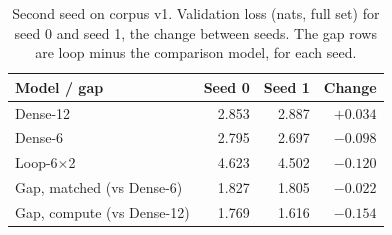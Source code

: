 \begin{table}[t]
\centering
\caption{Second seed on corpus v1. Validation loss (nats, full set) for seed 0 and seed 1, the change between seeds. The gap rows are loop minus the comparison model, for each seed.}
\label{tab:seeds}
\setlength{\tabcolsep}{4pt}
\begin{tabular}{lrrr}
\toprule
Model / gap & Seed 0 & Seed 1 & Change \\
\midrule
Dense-12 & 2.853 & 2.887 & $+0.034$ \\
Dense-6 & 2.795 & 2.697 & $-0.098$ \\
Loop-6$\times$2 & 4.623 & 4.502 & $-0.120$ \\
\midrule
Gap, matched (vs Dense-6) & 1.827 & 1.805 & $-0.022$ \\
Gap, compute (vs Dense-12) & 1.769 & 1.616 & $-0.154$ \\
\bottomrule
\end{tabular}
\end{table}
